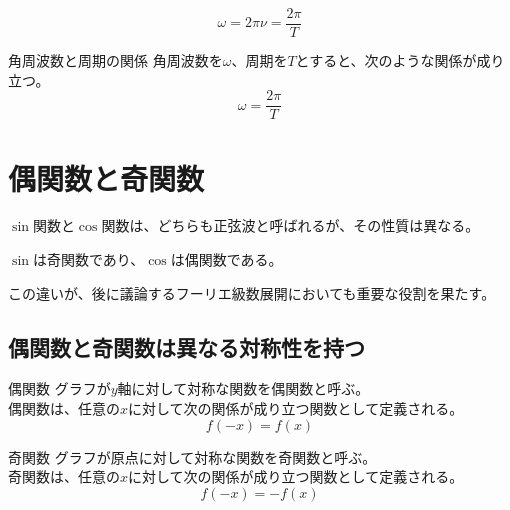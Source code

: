 \documentclass[../imaging-math]{subfiles}
\begin{document}
\begin{equation}
  \omega = 2\pi\nu = \dfrac{2\pi}{T}
\end{equation}

\begin{theorem}{角周波数と周期の関係}
  \titlegap
  角周波数を$\omega$、周期を$T$とすると、次のような関係が成り立つ。
  \LARGE
  \begin{equation}
    \omega = \dfrac{2\pi}{T}
  \end{equation}
\end{theorem}

\section{偶関数と奇関数}

$\sin$関数と$\cos$関数は、どちらも正弦波と呼ばれるが、その性質は異なる。

$\sin$は奇関数であり、$\cos$は偶関数である。

この違いが、後に議論するフーリエ級数展開においても重要な役割を果たす。

\subsection{偶関数と奇関数は異なる対称性を持つ}

\begin{definition}{偶関数}
  \titlegap
  グラフが$y$軸に対して対称な関数を偶関数と呼ぶ。\\
  偶関数は、任意の$x$に対して次の関係が成り立つ関数として定義される。
  \LARGE
  \begin{equation}
    f(-x) = f(x)
  \end{equation}
\end{definition}

\begin{definition}{奇関数}
  \titlegap
  グラフが原点に対して対称な関数を奇関数と呼ぶ。\\
  奇関数は、任意の$x$に対して次の関係が成り立つ関数として定義される。
  \LARGE
  \begin{equation}
    f(-x) = -f(x)
  \end{equation}
\end{definition}
\end{document}
